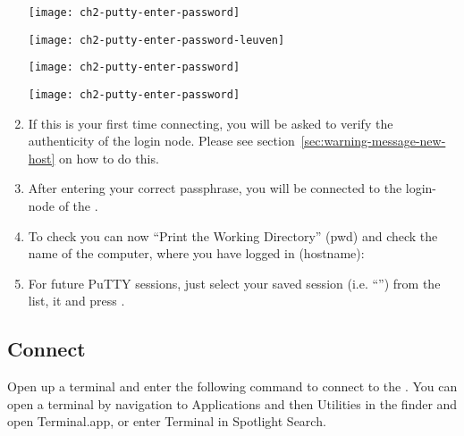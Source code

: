 \begin{enumerate}
\ifantwerpen
      \begin{center}
      \texttt{[image: ch2-putty-enter-password]}
      \end{center}
\fi
\ifleuven
      \begin{center}
      \texttt{[image: ch2-putty-enter-password-leuven]}
      \end{center}
\fi
\ifbrussel
      \begin{center}
      \texttt{[image: ch2-putty-enter-password]}
      \end{center}
\fi
\ifgent
      \begin{center}
      \texttt{[image: ch2-putty-enter-password]}
      \end{center}
\fi

    \item If this is your first time connecting, you will be asked to verify the authenticity of
        the login node. Please see section~\ref{sec:warning-message-new-host} on how to do this.

    \item  After entering your correct passphrase, you will be connected to the
      login-node of the \hpc.
    \item  To check you can now ``Print the Working Directory'' (pwd) and check
      the name of the computer, where you have logged in (hostname):

\begin{prompt}
\end{prompt}

    \item  For future PuTTY sessions, just select your saved session (i.e.
      ``\emph{\hpcname}'') from the list,  it and press
      .
  \end{enumerate}

\fi

\ifmacORlinux

  \subsection{Connect}
  \label{sec:connect}


  Open up a terminal and enter the following command to connect to the \hpc.
  \ifmac
  You can open a terminal by navigation to Applications and then Utilities in the finder and open Terminal.app, or enter Terminal in Spotlight Search.
  \fi

